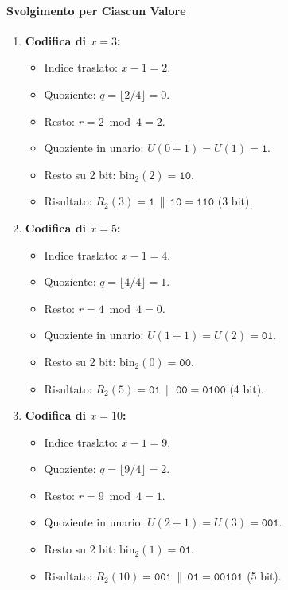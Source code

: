 \paragraph{Svolgimento per Ciascun Valore}
\begin{enumerate}
  \item \textbf{Codifica di $x = 3$:}
  \begin{itemize}
    \item Indice traslato: $x - 1 = 2$.
    \item Quoziente: $q = \lfloor 2 / 4 \rfloor = 0$.
    \item Resto: $r = 2 \bmod 4 = 2$.
    \item Quoziente in unario: $U(0 + 1) = U(1) = \texttt{1}$.
    \item Resto su 2 bit: $\text{bin}_2(2) = \texttt{10}$.
    \item Risultato: $R_2(3) = \texttt{1} \,\|\, \texttt{10} = \texttt{110}$ (3 bit).
  \end{itemize}

  \item \textbf{Codifica di $x = 5$:}
  \begin{itemize}
    \item Indice traslato: $x - 1 = 4$.
    \item Quoziente: $q = \lfloor 4 / 4 \rfloor = 1$.
    \item Resto: $r = 4 \bmod 4 = 0$.
    \item Quoziente in unario: $U(1 + 1) = U(2) = \texttt{01}$.
    \item Resto su 2 bit: $\text{bin}_2(0) = \texttt{00}$.
    \item Risultato: $R_2(5) = \texttt{01} \,\|\, \texttt{00} = \texttt{0100}$ (4 bit).
  \end{itemize}

  \item \textbf{Codifica di $x = 10$:}
  \begin{itemize}
    \item Indice traslato: $x - 1 = 9$.
    \item Quoziente: $q = \lfloor 9 / 4 \rfloor = 2$.
    \item Resto: $r = 9 \bmod 4 = 1$.
    \item Quoziente in unario: $U(2 + 1) = U(3) = \texttt{001}$.
    \item Resto su 2 bit: $\text{bin}_2(1) = \texttt{01}$.
    \item Risultato: $R_2(10) = \texttt{001} \,\|\, \texttt{01} = \texttt{00101}$ (5 bit).
  \end{itemize}


\end{enumerate}
